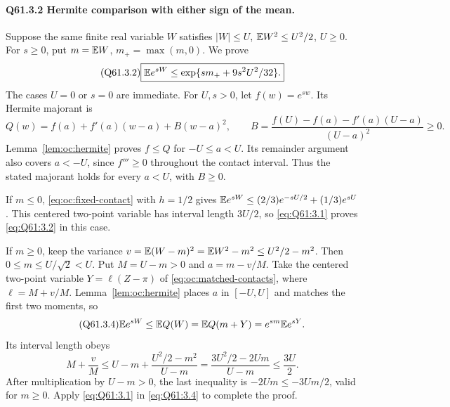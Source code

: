 \paragraph{Q61.3.2 Hermite comparison with either sign of the mean.}
Suppose the same finite real variable \(W\) satisfies
\(|W|\le\allowbreak  U\), \(\mathbb E W^2\le\allowbreak  U^2/2\), \(U\ge\allowbreak 0\).
For \(s\ge\allowbreak 0\), put \(m=\allowbreak \mathbb E W\), \(m_+=\allowbreak \max(m,\allowbreak 0)\). We prove
\begin{equation}\tag{Q61.3.2}\label{eq:Q61:3.2}
\boxed{\mathbb E e^{sW}\le\exp\{sm_++9s^2U^2/32\}.}
\end{equation}
The cases \(U=\allowbreak 0\) or \(s=\allowbreak 0\) are immediate. For \(U,\allowbreak s>\allowbreak 0\), let
\(f(w)=e^{sw}\). Its Hermite majorant is
\begin{equation}\tag{Q61.3.3}\label{eq:Q61:3.3}
Q(w)=f(a)+f'(a)(w-a)+B(w-a)^2,\qquad
B=\frac{f(U)-f(a)-f'(a)(U-a)}{(U-a)^2}\ge0.
\end{equation}
Lemma~\ref{lem:oc:hermite} proves \(f\le Q\) for \(-U\le a<U\).
Its remainder argument also covers \(a<-U\), since \(f'''\ge0\)
throughout the contact interval. Thus the stated majorant holds for
every \(a<U\), with \(B\ge0\).

If \(m\le0\), \eqref{eq:oc:fixed-contact} with \(h=1/2\) gives
\(\mathbb E e^{sW}\le(2/3)e^{-sU/2}+(1/3)e^{sU}\).
This centered two-point variable has interval length \(3U/2\),
so \eqref{eq:Q61:3.1} proves \eqref{eq:Q61:3.2} in this case.

If \(m\ge\allowbreak 0\), keep the variance
\(v=\allowbreak \mathbb E(W-m)^2=\allowbreak \mathbb E W^2-m^2\le\allowbreak  U^2/2-m^2\).
Then \(0\le\allowbreak  m\le\allowbreak  U/\sqrt2<\allowbreak U\). Put \(M=\allowbreak U-m>\allowbreak 0\) and
\(a=m-v/M\). Take the centered two-point variable
\(Y=\ell(Z-\pi)\) of \eqref{eq:oc:matched-contacts}, where
\(\ell=M+v/M\). Lemma~\ref{lem:oc:hermite} places \(a\) in
\([-U,U]\) and matches the first two moments, so
\begin{equation}\tag{Q61.3.4}\label{eq:Q61:3.4}
\mathbb E e^{sW}\le\mathbb E Q(W)=\mathbb E Q(m+Y)=e^{sm}\mathbb E e^{sY}.
\end{equation}
Its interval length obeys
\begin{equation}\tag{Q61.3.5}\label{eq:Q61:3.5}
M+\frac vM\le U-m+\frac{U^2/2-m^2}{U-m}
=\frac{3U^2/2-2Um}{U-m}\le\frac{3U}{2}.
\end{equation}
After multiplication by \(U-m>\allowbreak 0\), the last inequality is
\(-2Um\le\allowbreak -3Um/2\), valid for \(m\ge\allowbreak 0\).
Apply \eqref{eq:Q61:3.1} in \eqref{eq:Q61:3.4} to complete the proof.

